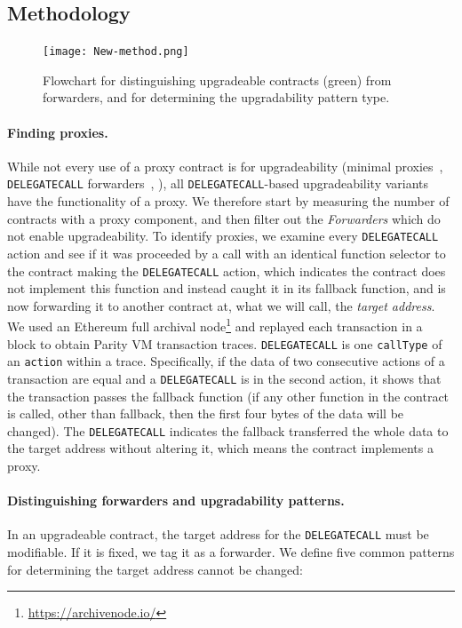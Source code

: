 \subsection{Methodology} 

\begin{figure}[t!]
  \texttt{[image: New-method.png]}\label{flowchart}
  \caption{Flowchart for distinguishing upgradeable contracts (green) from forwarders, and for determining the upgradability pattern type.}
\end{figure}


\paragraph{Finding proxies.} While not every use of a proxy contract is for upgradeability (\eg minimal proxies~\cite{minimalProxy}, \texttt{DELEGATECALL} forwarders~\cite{delegatecallForwarders}, \etc), all \texttt{DELEGATECALL}-based upgradeability variants have the functionality of a proxy. We therefore start by measuring the number of contracts with a proxy component, and then filter out the \textit{Forwarders} which do not enable upgradeability. To identify proxies, we examine every \texttt{DELEGATECALL} action and see if it was proceeded by a call with an identical function selector to the contract making the \texttt{DELEGATECALL} action, which indicates   the contract does not implement this function and instead caught it in its fallback function, and is now forwarding it to another contract at, what we will call, the \textit{target address}. We used an Ethereum full archival node\footnote{\url{https://archivenode.io/}} and replayed each transaction in a block to obtain Parity VM transaction traces. \texttt{DELEGATECALL} is one \texttt{callType} of an \texttt{action} within a trace. Specifically, if the data of two consecutive actions of a transaction are equal and a \texttt{DELEGATECALL} is in the second action, it shows that the transaction passes the fallback function (if any other function in the contract is called, other than fallback, then the first four bytes of the data will be changed). The \texttt{DELEGATECALL} indicates the fallback transferred the whole data to the target address without altering it, which means the contract implements a proxy.

\paragraph{Distinguishing forwarders and upgradability patterns.} In an upgradeable contract, the target address for the \texttt{DELEGATECALL} must be modifiable. If it is fixed, we tag it as a forwarder. We define five common patterns for determining the target address cannot be changed:

